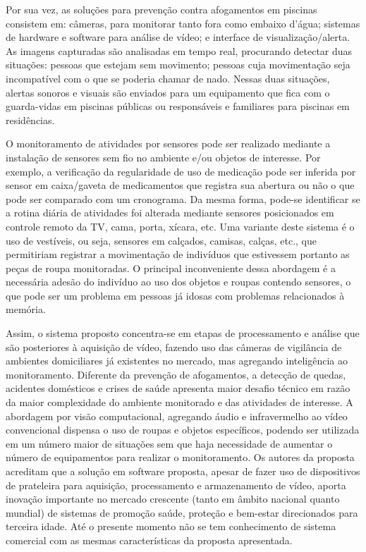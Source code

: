 Por sua vez, as soluções para prevenção contra afogamentos em piscinas consistem em: câmeras, para monitorar tanto fora como embaixo d’água; sistemas de hardware e software para análise de vídeo; e interface de visualização/alerta. As imagens capturadas são analisadas em tempo real, procurando detectar duas situações: pessoas que estejam sem movimento; pessoas cuja movimentação seja incompatível com o que se poderia chamar de nado. Nessas duas situações, alertas sonoros e visuais são enviados para um equipamento que fica com o guarda-vidas em piscinas públicas ou responsáveis e familiares para piscinas em residências.

O monitoramento de atividades por sensores pode ser realizado mediante a instalação de sensores sem fio no ambiente e/ou objetos de interesse. Por exemplo, a verificação da regularidade de uso de medicação pode ser inferida por sensor em caixa/gaveta de medicamentos que registra sua abertura ou não o que pode ser comparado com um cronograma. Da mesma forma, pode-se identificar se a rotina diária de atividades foi alterada mediante sensores posicionados em controle remoto da TV, cama, porta, xícara, etc. Uma variante deste sistema é o uso de vestíveis, ou seja, sensores em calçados, camisas, calças, etc., que permitiriam registrar a movimentação de indivíduos que estivessem portanto as peças de roupa monitoradas. O principal inconveniente dessa abordagem é a necessária adesão do indivíduo ao uso dos objetos e roupas contendo sensores, o que pode ser um problema em pessoas já idosas com problemas relacionados à memória.

Assim, o sistema proposto concentra-se em etapas de processamento e análise que são posteriores à aquisição de vídeo, fazendo uso das câmeras de vigilância de ambientes domiciliares já existentes no mercado, mas agregando inteligência ao monitoramento. Diferente da prevenção de afogamentos, a detecção de quedas, acidentes domésticos e crises de saúde apresenta maior desafio técnico em razão da maior complexidade do ambiente monitorado e das atividades de interesse. A abordagem por visão computacional, agregando áudio e infravermelho ao vídeo convencional dispensa o uso de roupas e objetos específicos, podendo ser utilizada em um número maior de situações sem que haja necessidade de aumentar o número de equipamentos para realizar o monitoramento. Os autores da proposta acreditam que a solução em software proposta, apesar de fazer uso de dispositivos de prateleira para aquisição, processamento e armazenamento de vídeo, aporta inovação importante no mercado crescente (tanto em âmbito nacional quanto mundial) de sistemas de promoção saúde, proteção e bem-estar direcionados para terceira idade. Até o presente momento não se tem conhecimento de sistema comercial com as mesmas características da proposta apresentada.

